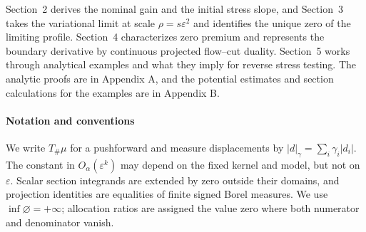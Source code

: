 Section~2 derives the nominal gain and the initial stress slope, and Section~3 takes the variational limit at scale \(\rho=s\varepsilon^2\) and identifies the unique zero of the limiting profile. Section~4 characterizes zero premium and represents the boundary derivative by continuous projected flow--cut duality. Section~5 works through analytical examples and what they imply for reverse stress testing. The analytic proofs are in Appendix A, and the potential estimates and section calculations for the examples are in Appendix B.

\paragraph{Notation and conventions} We write \(T_\#\mu\) for a pushforward and measure displacements by \(|d|_\gamma=\sum_i\gamma_i|d_i|\). The constant in \(O_\alpha(\varepsilon^k)\) may depend on the fixed kernel and model, but not on \(\varepsilon\). Scalar section integrands are extended by zero outside their domains, and projection identities are equalities of finite signed Borel measures. We use \(\inf\varnothing=+\infty\); allocation ratios are assigned the value zero where both numerator and denominator vanish.
